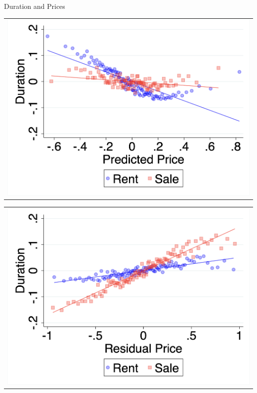 \documentclass[english,xcolor=svgnames,aspectratio=169]{beamer}
\begin{document}

\begin{frame}{Duration and Prices}

\begin{minipage}{.45\textwidth}
\begin{table}
\scriptsize
\begin{tabular}{c}
\includegraphics[scale = 0.22]{figures/binscatter_pred_dur_rent_sale.png}
\end{tabular}
\end{table}
\end{minipage}
\begin{minipage}{.45\textwidth}
\begin{table}
\scriptsize
\begin{tabular}{c}
\includegraphics[scale = 0.22]{figures/binscatter_pres_dur_rent_sale.png}

\end{tabular}
\end{table}
\end{minipage}
\end{frame}
\end{document}
